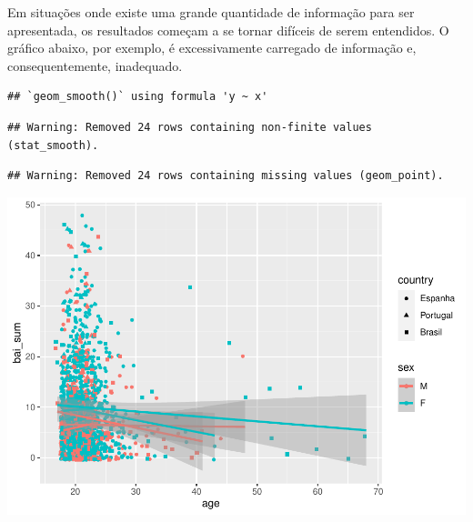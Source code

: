 \documentclass[
]{book}
\newenvironment{Shaded}{\begin{snugshade}}{\end{snugshade}}
\newcommand{\DataTypeTok}[1]{\textcolor[rgb]{0.13,0.29,0.53}{#1}}
\newcommand{\KeywordTok}[1]{\textcolor[rgb]{0.13,0.29,0.53}{\textbf{#1}}}
\newcommand{\NormalTok}[1]{#1}
\newcommand{\OperatorTok}[1]{\textcolor[rgb]{0.81,0.36,0.00}{\textbf{#1}}}
\newcommand{\StringTok}[1]{\textcolor[rgb]{0.31,0.60,0.02}{#1}}
\begin{document}
Em situações onde existe uma grande quantidade de informação para ser apresentada, os resultados começam a se tornar difíceis de serem entendidos. O gráfico abaixo, por exemplo, é excessivamente carregado de informação e, consequentemente, inadequado.

\begin{Shaded}
\end{Shaded}

\begin{verbatim}
## `geom_smooth()` using formula 'y ~ x'
\end{verbatim}

\begin{verbatim}
## Warning: Removed 24 rows containing non-finite values (stat_smooth).
\end{verbatim}

\begin{verbatim}
## Warning: Removed 24 rows containing missing values (geom_point).
\end{verbatim}

\begin{center}\includegraphics{gitbook-demo_files/figure-latex/unnamed-chunk-27-1} \end{center}
\end{document}

